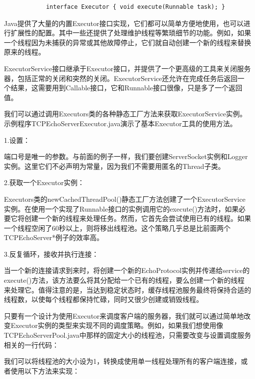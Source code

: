 		\begin{verbatim}
			interface Executor { void execute(Runnable task); } 
		\end{verbatim}

		Java提供了大量的内置Executor接口实现，它们都可以简单方便地使用，也可以进行扩展性的配置。其中一些还提供了处理维护线程等繁琐细节的功能。例如，如果一个线程因为未捕获的异常或其他故障停止，它们就自动创建一个新的线程来替换原来的线程。 

		ExecutorService接口继承于Executor接口，并提供了一个更高级的工具来关闭服务器，包括正常的关闭和突然的关闭。ExecutorService还允许在完成任务后返回一个结果，这需要用到Callable接口，它和Runnable接口很像，只是多了一个返回值。 

		我们可以通过调用Executors类的各种静态工厂方法来获取ExecutorService实例。示例程序TCPEchoServerExecutor.java演示了基本Executor工具的使用方法。 

		

		1.设置：

		端口号是唯一的参数。与前面的例子一样，我们要创建ServerSocket实例和Logger实例。这里它们不必声明为常量，因为我们不需要用匿名的Thread子类。 

		2.获取一个Executor实例：

		Executors类的newCachedThreadPool()静态工厂方法创建了一个ExecutorService实例。在使用一个实现了Runnable接口的实例调用它的execute()方法时，如果必要它将创建一个新的线程来处理任务。然而，它首先会尝试使用已有的线程。如果一个线程空闲了60秒以上，则将移出线程池。这个策略几乎总是比前面两个TCPEchoServer*例子的效率高。 

		3.反复循环，接收并执行连接：

		当一个新的连接请求到来时，将创建一个新的EchoProtocol实例并传递给service的execute()方法，该方法要么将其分配给一个已有的线程，要么创建一个新的线程来处理它。值得注意的是，当达到稳定状态时，缓存线程池服务最终将保持合适的线程数，以使每个线程都保持忙碌，同时又很少创建或销毁线程。 

		只要有一个设计为使用Executor来调度客户端的服务器，我们就可以通过简单地改变Executor实例的类型来实现不同的调度策略。例如，如果我们想使用像TCPEchoServerPool.java中那样的固定大小的线程池，只需要改变与设置调度服务相关的一行代码： 

		

		我们可以将线程池的大小设为1，转换成使用单一线程处理所有的客户端连接，或者使用以下方法来实现： 

